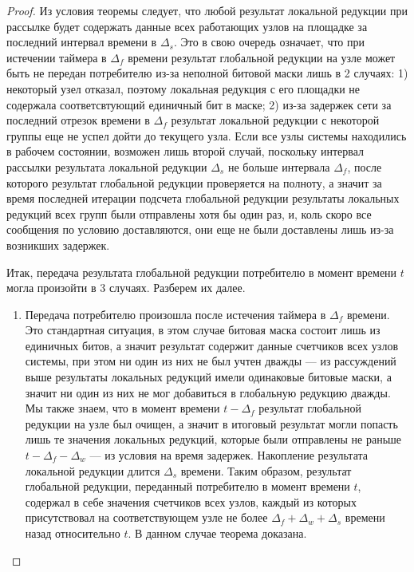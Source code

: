 \documentclass{article}
\theoremstyle{plain}
\theoremstyle{plain}
\theoremstyle{plain}
\theoremstyle{plain}
\theoremstyle{definition}
\theoremstyle{remark}
\theoremstyle{plain}
\begin{document}
\begin{proof}
    Из условия теоремы следует, что любой результат локальной редукции при рассылке будет содержать данные всех работающих узлов на площадке за последний интервал времени в $\Delta_s$. Это в свою очередь означает, что при истечении таймера в $\Delta_f$ времени результат глобальной редукции на узле может быть не передан потребителю из-за неполной битовой маски лишь в 2 случаях: 1) некоторый узел отказал, поэтому локальная редукция с его площадки не содержала соответсвтующий единичный бит в маске; 2) из-за задержек сети за последний отрезок времени в $\Delta_f$ результат локальной редукции с некоторой группы еще не успел дойти до текущего узла. Если все узлы системы находились в рабочем состоянии, возможен лишь второй случай, поскольку интервал рассылки результата локальной редукции $\Delta_s$ не больше интервала $\Delta_f$, после которого результат глобальной редукции проверяется на полноту, а значит за время последней итерации подсчета глобальной редукции результаты локальных редукций всех групп были отправлены хотя бы один раз, и, коль скоро все сообщения по условию доставляются, они еще не были доставлены лишь из-за возникших задержек.
    
    Итак, передача результата глобальной редукции потребителю в момент времени $t$ могла произойти в 3 случаях. Разберем их далее.
    
    \begin{enumerate}
        \item Передача потребителю произошла после истечения таймера в $\Delta_f$ времени. Это стандартная ситуация, в этом случае битовая маска состоит лишь из единичных битов, а значит результат содержит данные счетчиков всех узлов системы, при этом ни один из них не был учтен дважды --- из рассуждений выше результаты локальных редукций имели одинаковые битовые маски, а значит ни один из них не мог добавиться в глобальную редукцию дважды. Мы также знаем, что в момент времени $t - \Delta_f$ результат глобальной редукции на узле был очищен, а значит в итоговый результат могли попасть лишь те значения локальных редукций, которые были отправлены не раньше $t - \Delta_f - \Delta_w$ --- из условия на время задержек. Накопление результата локальной редукции длится $\Delta_s$ времени. Таким образом, результат глобальной редукции, переданный потребителю в момент времени $t$, содержал в себе значения счетчиков всех узлов, каждый из которых присутствовал на соответствующем узле не более $\Delta_f + \Delta_w + \Delta_s$ времени назад относительно $t$. В данном случае теорема доказана.
        

\end{enumerate}
\end{proof}
\end{document}

